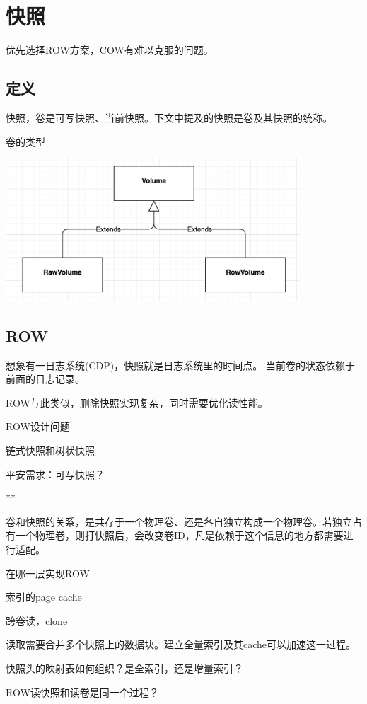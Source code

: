 \chapter{快照}

优先选择ROW方案，COW有难以克服的问题。

\section{定义}

快照，卷是可写快照、当前快照。下文中提及的快照是卷及其快照的统称。

卷的类型
\begin{center}
\includegraphics[width=11cm]{../imgs/volume-type.png}
\end{center}

\section{ROW}

想象有一日志系统(CDP)，快照就是日志系统里的时间点。
当前卷的状态依赖于前面的日志记录。

ROW与此类似，删除快照实现复杂，同时需要优化读性能。

ROW设计问题
\begin{enumbox}
\item 链式快照和树状快照
\item 平安需求：可写快照？
\item ***
\item 卷和快照的关系，是共存于一个物理卷、还是各自独立构成一个物理卷。若独立占有一个物理卷，则打快照后，会改变卷ID，凡是依赖于这个信息的地方都需要进行适配。
\item 在哪一层实现ROW
\item 索引的page cache
\item 跨卷读，clone
\item 读取需要合并多个快照上的数据块。建立全量索引及其cache可以加速这一过程。
\item 快照头的映射表如何组织？是全索引，还是增量索引？
\item ROW读快照和读卷是同一个过程？
\end{enumbox}

